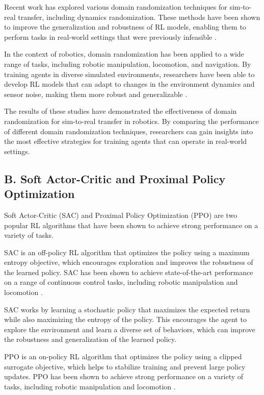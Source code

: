 \documentclass[12pt]{article}
\begin{document}
Recent work has explored various domain randomization techniques for sim-to-real transfer, including dynamics randomization. These methods have been shown to improve the generalization and robustness of RL models, enabling them to perform tasks in real-world settings that were previously infeasible \cite{Peng2018}.

In the context of robotics, domain randomization has been applied to a wide range of tasks, including robotic manipulation, locomotion, and navigation. By training agents in diverse simulated environments, researchers have been able to develop RL models that can adapt to changes in the environment dynamics and sensor noise, making them more robust and generalizable \cite{Kormushev2013, Hofer2020}.

The results of these studies have demonstrated the effectiveness of domain randomization for sim-to-real transfer in robotics. By comparing the performance of different domain randomization techniques, researchers can gain insights into the most effective strategies for training agents that can operate in real-world settings.

\subsection{B. Soft Actor-Critic and Proximal Policy Optimization}

Soft Actor-Critic (SAC) and Proximal Policy Optimization (PPO) are two popular RL algorithms that have been shown to achieve strong performance on a variety of tasks. 

SAC is an off-policy RL algorithm that optimizes the policy using a maximum entropy objective, which encourages exploration and improves the robustness of the learned policy. SAC has been shown to achieve state-of-the-art performance on a range of continuous control tasks, including robotic manipulation and locomotion \cite{Haarnoja2018}.

SAC works by learning a stochastic policy that maximizes the expected return while also maximizing the entropy of the policy. This encourages the agent to explore the environment and learn a diverse set of behaviors, which can improve the robustness and generalization of the learned policy.

PPO is an on-policy RL algorithm that optimizes the policy using a clipped surrogate objective, which helps to stabilize training and prevent large policy updates. PPO has been shown to achieve strong performance on a variety of tasks, including robotic manipulation and locomotion \cite{Schulman2017}.
\end{document}
